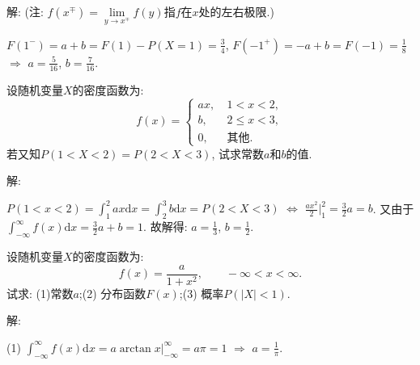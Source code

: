 \documentclass[standard]{ExBook}
\renewenvironment{shaded}{%
  \def\FrameCommand{\fboxsep=\FrameSep \colorbox{shadecolor}}%
  \MakeFramed{\advance\hsize-\width \FrameRestore}%
}{%
  \endMakeFramed
}
\begin{document}
\begin{qitems}
\vspace{\dimexpr2.5cm-5em\relax}

解: (注: $f(x^\mp)=\lim\limits_{y\to x^\mp}f(y)$指$f$在$x$处的左右极限.)

$F(1^-)=a+b=F(1)-P(X=1)=\displaystyle\frac{3}{4}$, $F(-1^+)=-a+b=F(-1)=\displaystyle\frac{1}{8}$ $\Longrightarrow$ $a=\displaystyle\frac{5}{16}$, $b=\displaystyle\frac{7}{16}$.

\vspace{2.5cm-5em}

    \begin{bbox}
    \begin{shaded}
        \qitem
设随机变量$X$的密度函数为:
$$
    f(x)=
    \left\{
    \begin{array}{ll}
        ax,\ &1 < x < 2,\\
        b,\ &2 \leq x < 3,\\
        0,\ &\text{其他}.
    \end{array}
    \right.
$$
若又知$P(1 < X <2)=P(2 < X < 3)$, 试求常数$a$和$b$的值.
    \end{shaded}
    \end{bbox}

\vspace{\dimexpr2.5cm-5em\relax}

解:

$\displaystyle P(1 < x < 2)=\int_{1}^{2}ax \mathrm{d}x=\int_{2}^{3}b\mathrm{d}x=P(2 < X < 3)$ $\Longleftrightarrow$ $\displaystyle\frac{a x^2}{2}\bigg|_{1}^{2}=\frac{3}{2}a=b$. 又由于$\displaystyle\int_{-\infty}^{\infty}f(x)\mathrm{d}x=\frac{3}{2}a+b=1$. 故解得: $a=\displaystyle\frac{1}{3}$, $b=\displaystyle\frac{1}{2}$.

\vspace{2.5cm-5em}

    \begin{bbox}
    \begin{shaded}
        \qitem
设随机变量$X$的密度函数为:
$$f(x)=\frac{a}{1+x^2},\qquad -\infty < x < \infty.$$
试求: (1)常数$a$;\qquad(2) 分布函数$F(x)$;\qquad(3) 概率$P(|X| < 1)$.
    \end{shaded}
    \end{bbox}

\vspace{\dimexpr2.5cm-5em\relax}

解: 

(1) $\displaystyle\int_{-\infty}^{\infty}f(x)\mathrm{d}x=a\arctan x\big|_{-\infty}^{\infty}=a\pi=1$ $\Longrightarrow$ $a=\displaystyle\frac{1}{\pi}$.


\end{qitems}
\end{document}
